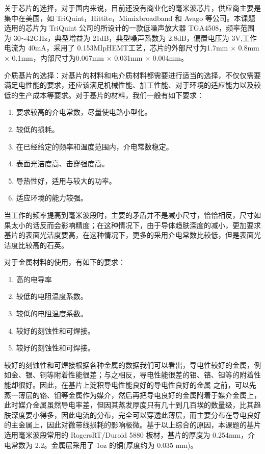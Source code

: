 关于芯片的选择，对于国内来说，目前还没有商业化的毫米波芯片，供应商主要是集中在美国，如 TriQuint，Hittite，Mimixbroadband 和 Avago 等公司。本课题选用的芯片为 TriQuint 公司的所设计的一款低噪声放大器 TGA4508，频率范围为 30$\sim$42GHz，典型增益为 21dB，典型噪声系数为 2.8dB，偏置电压为 3V,工作电流为 40mA，采用了 0.15\quad 3MI\quad pHEMT工艺，芯片的外部尺寸为1.7mm $\times$ 0.8mm $\times$ 0.1mm，内部尺寸为0.067mm $\times$ 0.031mm $\times$ 0.004mm。

介质基片的选择：对基片的材料和电介质材料都需要进行适当的选择，不仅仅需要满足电性能的要求，还应该满足机械性能、加工性能、对于环境的适应能力以及较低的生产成本等要求。对于基片的材料，我们一般有如下要求：
\begin{enumerate}
	\item 要求较高的介电常数，尽量使电路小型化。
	\item 较低的损耗。
	\item 在已经给定的频率和温度范围内，介电常数稳定。
	\item 表面光洁度高、击穿强度高。
	\item 导热性好，适用与较大的功率。
	\item 适应环境的能力较强。
\end{enumerate}

当工作的频率提高到毫米波段时，主要的矛盾并不是减小尺寸，恰恰相反，尺寸如果太小的话反而会影响精度；在这种情况下，由于导体趋肤深度的减小，更加要求基片的表面光洁度要高，在这种情况下，更多的采用介电常数比较低，但是表面光洁度比较高的石英。

对于金属材料的使用，有如下的要求：
\begin{enumerate}
	\item 高的电导率
	\item 较低的电阻温度系数。
	\item 较低的电阻温度系数。
	\item 较好的刻蚀性和可焊接。
	\item 较好的刻蚀性和可焊接。
\end{enumerate}

较好的刻蚀性和可焊接根据各种金属的数据我们可以看出，导电性较好的金属，例如金、银、铜等附着性能很差；与之相反，导电性能很差的钼、铬、钽等的附着性能却很好。因此，在基片上淀积导电性能良好的导电性良好的金属 之前，可以先蒸一薄层的铬、钼等金属作为媒介，然后再把导电良好的金属附着于媒介金属上，此时媒介金属虽然导电率差，但因其蒸发厚度只有几十到几百埃的数量级，比其趋肤深度要小得多，因此电流的分布，完全可以穿透此薄层，而主要分布在导电良好的主金属上，因此对微带线损耗的影响极微。基于以上综合的原因，本课题的基片选用毫米波段常用的 Rogers\quad RT/Duroid 5880 板材，基片的厚度为 0.254mm，介电常数为 2.2。金属层采用了 1oz 的铜(厚度约为 0.035 mm)。

